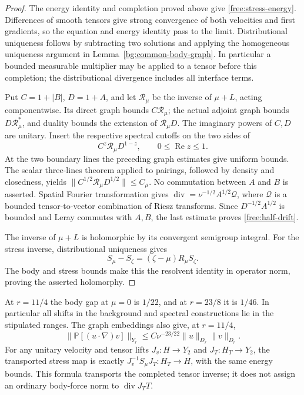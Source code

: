 \begin{proof}
The energy identity and completion proved above give
\eqref{free:stress-energy}. Differences of smooth tensors give strong
convergence of both velocities and first gradients, so the equation
and energy identity pass to the limit. Distributional uniqueness
follows by subtracting two solutions and applying the homogeneous
uniqueness argument in Lemma~\ref{bg:common-body-graph}.
In particular a bounded measurable multiplier may be applied to a
tensor before this completion; the distributional divergence includes
all interface terms.

Put \(C=1+|B|\), \(D=1+A\), and let \(\mathcal R_\mu\) be the
inverse of \(\mu+L\), acting componentwise. Its direct graph bounds
\(C\mathcal R_\mu\); the actual adjoint graph bounds
\(D\mathcal R_\mu^*\), and duality bounds the extension of
\(\mathcal R_\mu D\). The imaginary powers of \(C,D\) are unitary.
Insert the respective spectral cutoffs on the two sides of
\[
 C^z\mathcal R_\mu D^{1-z},\qquad
                 0\le\operatorname{Re}z\le1.
\]
At the two boundary lines the preceding graph estimates give
uniform bounds. The scalar three-lines theorem applied to pairings,
followed by density and closedness, yields
\(\|C^{1/2}\mathcal R_\mu D^{1/2}\|\le C_\mu\).
No commutation between \(A\) and \(B\) is asserted. Spatial Fourier
transformation gives
\(\operatorname{div}=\nu^{-1/2}A^{1/2}\mathcal Q\), where
\(\mathcal Q\) is a bounded tensor-to-vector combination of Riesz
transforms. Since \(D^{-1/2}A^{1/2}\) is bounded and Leray commutes
with \(A,B\), the last estimate proves \eqref{free:half-drift}.

The inverse of \(\mu+L\) is holomorphic by its convergent semigroup integral.
For the stress inverse, distributional uniqueness gives
\[
 S_\mu-S_\zeta=(\zeta-\mu)R_\mu S_\zeta.
\]
The body and stress bounds make this the resolvent identity in
operator norm, proving the asserted holomorphy.
\end{proof}

At \(r=11/4\) the body gap at \(\mu=0\) is \(1/22\), and at
\(r=23/8\) it is \(1/46\). In particular all shifts in the
background and spectral constructions lie in the stipulated ranges.
The graph embeddings also give, at \(r=11/4\),
\[
 \|\mathbb P[(u\cdot\nabla)v]\|_{Y_r}
 \le C\nu^{-23/22}\|u\|_{D_r}\|v\|_{D_r}.
\]
For any unitary velocity and tensor lifts \(J_v:H\to Y_2\) and
\(J_T:H_T\to Y_2\), the transported stress map is exactly
\(J_v^{-1}S_\mu J_T:H_T\to H\), with the same energy bounds.
This formula transports the completed tensor inverse; it does not
assign an ordinary body-force norm to \(\operatorname{div}J_TT\).
